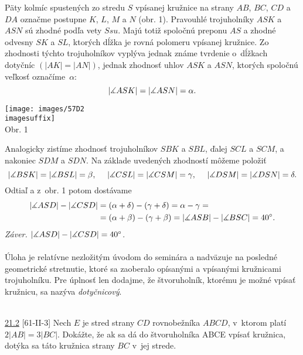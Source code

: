 \rieh Päty kolmíc spustených zo stredu $S$ vpísanej kružnice na strany $AB$, $BC$, $CD$ a $DA$ označme postupne $K$, $L$, $M$ a $N$ (obr. 1). Pravouhlé trojuholníky $ASK$ a $ASN$ sú zhodné podľa vety $Ssu$. Majú totiž spoločnú preponu $AS$ a zhodné odvesny $SK$ a $SL$, ktorých dĺžka je rovná polomeru vpísanej kružnice. Zo zhodnosti týchto trojuholníkov vyplýva jednak známe tvrdenie o~dĺžkach dotyčníc $(|AK| = |AN|)$, jednak zhodnosť uhlov $ASK$ a $ASN$, ktorých spoločnú veľkosť označíme~$\alpha$:$$|\measuredangle ASK| = |\measuredangle ASN| = \alpha.$$
\begin{center}
\texttt{[image: images/57D2\\imagesuffix]}\\

Obr. 1
\end{center}
Analogicky zistíme zhodnosť trojuholníkov $SBK$ a $SBL$, ďalej $SCL$ a $SCM$, a nakoniec $SDM$ a $SDN$. Na základe uvedených zhodností môžeme položiť
$$|\measuredangle BSK| = |\measuredangle BSL| = \beta, \ \ \ \  |\measuredangle CSL| = |\measuredangle CSM| = \gamma, \ \ \ \  |\measuredangle DSM| = |\measuredangle DSN| = \delta.$$
Odtiaľ a z~obr. 1 potom dostávame
\begin{align*}
|\measuredangle ASD| - |\measuredangle CSD| &= (\alpha + \delta)- (\gamma + \delta) = \alpha - \gamma =\\
&= (\alpha + \beta) - (\gamma + \beta) = |\measuredangle ASB| - |\measuredangle BSC| = 40^\circ.
\end{align*}
\textit{Záver.} $|\measuredangle ASD|  -|\measuredangle CSD| = 40^\circ$.\\
\\
\kom Úloha je relatívne nezložitým úvodom do seminára a nadväzuje na posledné geometrické stretnutie, ktoré sa zaoberalo opísanými a vpísanými kružnicami trojuholníku. Pre úplnosť len dodajme, že štvoruholník, ktorému je možné vpísať kružnicu, sa nazýva \textit{dotyčnicový}.\\
\\
\begin{tcolorbox}[breakable,notitle,boxrule=0pt,colback=light-gray,colframe=light-gray]\ul{21.2} [61-II-3] Nech $E$ je stred strany $CD$ rovnobežníka $ABCD$, v~ktorom platí $2|AB| = 3|BC|$. Dokážte, že ak sa dá do štvoruholníka ABCE vpísať kružnica, dotýka sa táto kružnica strany $BC$ v~jej strede.

\end{tcolorbox}

